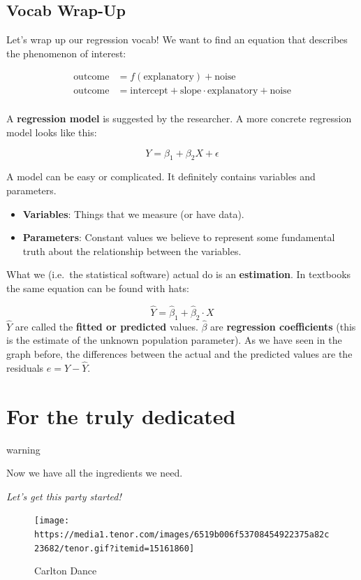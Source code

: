 \documentclass[
]{book}
\providecommand{\tightlist}{%
  \setlength{\itemsep}{0pt}\setlength{\parskip}{0pt}}
\begin{document}
\hypertarget{vocab-wrap-up}{%
\subsection{Vocab Wrap-Up}\label{vocab-wrap-up}}

Let's wrap up our regression vocab! We want to find an equation that describes the phenomenon of interest:

\[ \begin{align}
\text{outcome} &= f(\text{explanatory}) + \text{noise} \tag{Generic statistical model} \\
\text{outcome} &= \text{intercept} + \text{slope} \cdot \text{explanatory} + \text{noise} \tag{Generic linear model} \\
\end{align}\]

A \textbf{regression model} is suggested by the researcher. A more concrete regression model looks like this:

\[Y = \beta_1 + \beta_2 X + \epsilon\]

A model can be easy or complicated. It definitely contains variables and parameters.

\begin{itemize}
\tightlist
\item
  \textbf{Variables}: Things that we measure (or have data).
\item
  \textbf{Parameters}: Constant values we believe to represent some fundamental truth about the relationship between the variables.
\end{itemize}

What we (i.e.~the statistical software) actual do is an \textbf{estimation}. In textbooks the same equation can be found with hats:

\[   \widehat{Y}  = \widehat{\beta}_1 + \widehat{\beta}_2 \cdot X \]
\(\widehat{Y}\) are called the \textbf{fitted or predicted} values. \(\widehat{\beta}\) are \textbf{regression coefficients} (this is the estimate of the unknown population parameter). As we have seen in the graph before, the differences between the actual and the predicted values are the residuals \(e = Y - \widehat{Y}\).

\hypertarget{for-the-truly-dedicated}{%
\section{For the truly dedicated}\label{for-the-truly-dedicated}}

\begin{infobox}warning

Now we have all the ingredients we need.

\emph{Let's get this party started!}

\begin{figure}
\centering
\texttt{[image: https://media1.tenor.com/images/6519b006f53708454922375a82c23682/tenor.gif?itemid=15161860]}
\caption{Carlton Dance}
\end{figure}

\end{infobox}
\end{document}
